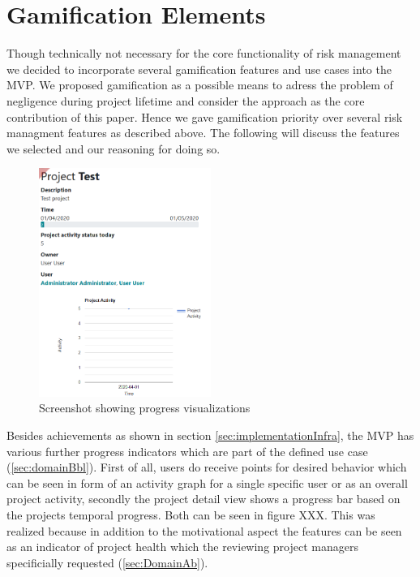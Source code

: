 
\section{Gamification Elements}
\label{sec:implementationGami}

Though technically not necessary for the core functionality of risk management we decided to incorporate several gamification features and use cases into the \ac{MVP}. We proposed gamification as a possible means to adress the problem of negligence during project lifetime and consider the approach as the core contribution of this paper. Hence we gave gamification priority over several risk managment features as described above. The following will discuss the features we selected and our reasoning for doing so.

\begin{figure}
	\includegraphics[width=0.5\textwidth]{Assets/implementation_shots/projectdetail.png}
	\caption{Screenshot showing progress visualizations}
	\label{fig:projectdetail}
\end{figure}

Besides achievements as shown in section \ref{sec:implementationInfra}, the \ac{MVP} has various further progress indicators which are part of the defined use case (\ref{sec:domainBbl}). First of all, users do receive points for desired behavior which can be seen in form of an activity graph for a single specific user or as an overall project activity, secondly the project detail view shows a progress bar based on the projects temporal progress. Both can be seen in figure XXX. This was realized because in addition to the motivational aspect the features can be seen as an indicator of project health which the reviewing project managers specificially requested (\ref{sec:DomainAb}).

